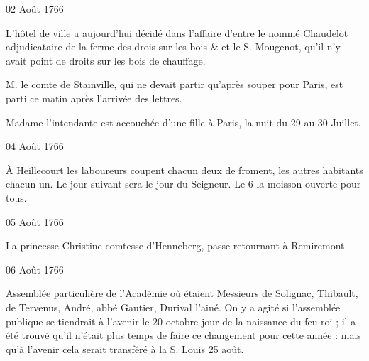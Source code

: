                     \begin{diary}{02 Août 1766}{}


                           L'hôtel de ville a aujourd'hui décidé dans l'affaire
                           d'entre le nommé Chaudelot adjudicataire de la ferme
                           des drois sur les bois \& et le S.
                              Mougenot, qu'il
                           n'y avait point de droits sur les bois de chauffage. \bigskip



                           M. le comte de Stainville, qui ne
                           devait partir
                           qu'après souper pour Paris, est
                           parti ce matin
                           après l'arrivée des lettres. \bigskip



                           Madame l'intendante est accouchée d'une fille
                           à Paris, la nuit du 29 au 30 Juillet. \bigskip


                     \end{diary}

                     \begin{diary}{04 Août 1766}{}

                         À Heillecourt les laboureurs coupent chacun
                           deux de froment, les autres habitants
                           chacun un. Le jour suivant sera le jour
                           du Seigneur. Le 6 la moisson ouverte
                           pour tous. \bigskip


                     \end{diary}

                     \begin{diary}{05 Août 1766}{}


                           La princesse Christine comtesse d'Henneberg, passe retournant
                           à Remiremont. \bigskip


                     \end{diary}

                     \begin{diary}{06 Août 1766}{}

                         Assemblée particulière de l'Académie où
                           étaient Messieurs
                           de Solignac, Thibault, de
                              Tervenus,
                           André, abbé Gautier, Durival
                              l'ainé.
                           On y a agité si l'assemblée publique se tiendrait
                           à l'avenir le 20 octobre jour de la naissance du feu roi ; il a été trouvé qu'il
                           n'était plus
                           temps de faire ce changement pour cette
                           année : mais qu'à l'avenir cela serait
                           transféré à la S. Louis 25 août. \bigskip


                     \end{diary}

